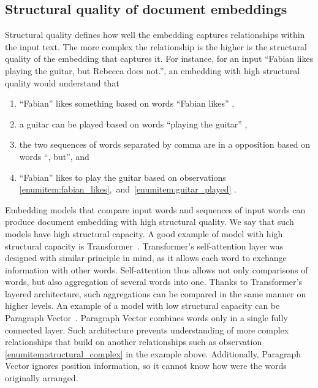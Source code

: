 \subsection{Structural quality of document embeddings}

Structural quality defines how well the embedding captures relationships within
the input text. The more complex the relationship is the higher is the
structural quality of the embedding that captures it. For instance, for an
input ``Fabian likes playing the guitar, but Rebecca does not.'', an embedding
with high structural quality would understand that

\begin{enumerate}

  \item ``Fabian'' likes something based on words ``Fabian likes''
    \label{enumitem:fabian_likes},

  \item a guitar can be played based on words ``playing the guitar''
    \label{enumitem:guitar_played},

  \item the two sequences of words separated by comma are in a opposition based
    on words ``, but'', and

  \item ``Fabian'' likes to play the guitar based on observations
    \ref{enumitem:fabian_likes},~and~\ref{enumitem:guitar_played}
    \label{enumitem:structural_complex}.

\end{enumerate}

Embedding models that compare input words and sequences of input words can
produce document embedding with high structural quality. We say that such
models have high structural capacity. A good example of model with high
structural capacity is Transformer~\citep{vaswani2017attention}. Transformer's
self-attention layer was designed with similar principle in mind, as it allows
each word to exchange information with other words. Self-attention thus allows
not only comparisons of words, but also aggregation of several words into one.
Thanks to Transformer's layered architecture, such aggregations can be compared
in the same manner on higher levels. An example of a model with low structural
capacity can be Paragraph Vector~\citep{le2014distributed}. Paragraph Vector
combines words only in a single fully connected layer. Such architecture
prevents understanding of more complex relationships that build on another
relationships such as observation \ref{enumitem:structural_complex} in the
example above. Additionally, Paragraph Vector ignores position information, so
it cannot know how were the words originally arranged.

